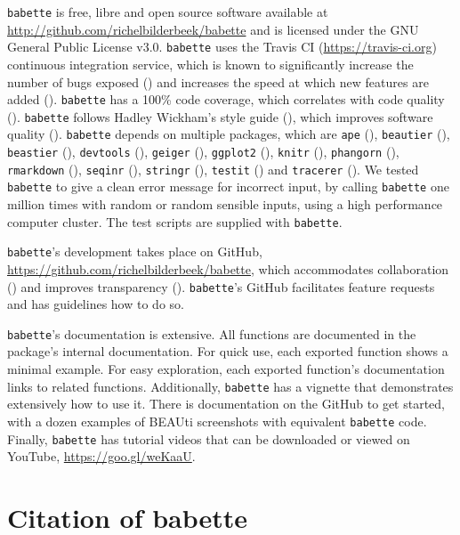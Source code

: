 \verb;babette; is free, libre and open source software available at 
\url{http://github.com/richelbilderbeek/babette}
and is licensed under the GNU General Public License v3.0.
\verb;babette; uses the Travis CI (\url{https://travis-ci.org})
continuous integration service, which is known to significantly 
increase the number of bugs exposed (\cite{vasilescu2015}) and increases
the speed at which new features are added (\cite{vasilescu2015}).
\verb;babette; has a 100\% code coverage, which correlates with 
code quality (\cite{horgan1994,del1995correlation}). 
\verb;babette; follows Hadley Wickham's style guide (\cite{style_guide}), 
which improves software quality (\cite{fang2001}).
\verb;babette; depends on multiple packages, which are 
\verb;ape; (\cite{APE}), 
\verb;beautier; (\cite{beautier}),
\verb;beastier; (\cite{beastier}),
\verb;devtools; (\cite{devtools}),
\verb;geiger; (\cite{GEIGER}),
\verb;ggplot2; (\cite{ggplot2}),
\verb;knitr; (\cite{knitr}),
\verb;phangorn; (\cite{phangorn}),
\verb;rmarkdown; (\cite{rmarkdown}),
\verb;seqinr; (\cite{seqinr}),
\verb;stringr; (\cite{stringr}),
\verb;testit; (\cite{testit}) and 
\verb;tracerer; (\cite{tracerer}).
We tested \verb;babette; to give a clean 
error message for incorrect input, by
calling \verb;babette; one million times
with random or random sensible inputs, 
using a high performance computer cluster. 
The test scripts are supplied with \verb;babette;.

\verb;babette;'s development takes place on GitHub,
\url{https://github.com/richelbilderbeek/babette}, 
which accommodates collaboration (\cite{perez2016ten}) 
and improves transparency (\cite{gorgolewski2016practical}).
\verb;babette;'s GitHub facilitates feature requests and 
has guidelines how to do so.

\verb;babette;'s documentation is extensive. All functions are documented
in the package's internal documentation. For quick use, 
each exported function shows a minimal example. 
For easy exploration, each exported function's documentation links to related functions.
Additionally, \verb;babette; has a vignette that demonstrates extensively how
to use it. There is documentation on the GitHub to get started, 
with a dozen examples of BEAUti screenshots with equivalent \verb;babette; code.
Finally, \verb;babette; has tutorial videos that can 
be downloaded or viewed on YouTube, \url{https://goo.gl/weKaaU}.

\section{Citation of babette}

